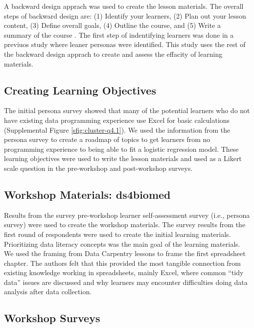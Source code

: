 \documentclass[030-workshop.tex]{subfiles}
\begin{document}
  A backward design apprach was used to create the lesson materials.
  The overall steps of backward design are:
  (1) Identify your learners,
  (2) Plan out your lesson content,
  (3) Define overall goals,
  (4) Outline the course, and
  (5) Write a summary of the course
  \cite{wilson2019teaching}.
  The first step of indentifying learners was done in a previuos study where leaner personas were identified.
  This study uses the rest of the backward design apprach to create and assess the effacity of learning materials.

  \subsection{Creating Learning Objectives}

    The initial persona survey showed that many of the potential learners who do not
    have existing data programming experience use Excel for basic calculations
    (Supplemental Figure \ref{sfig:cluster-q4.1}).
    We used the information from the persona survey to create a roadmap of topics
    to get learners from no programming experience to being able to fit a logistic regression model.
    These learning objectives were used to write the lesson materials
    and used as a Likert scale question in the pre-workshop and post-workshop surveys.

  \subsection{Workshop Materials: ds4biomed}

    Results from the survey pre-workshop learner self-assessment survey (i.e., persona survey)
    were used to create the workshop materials.
    The survey results from the first round of respondents were used to create the initial
    learning materials.
    Prioritizing data literacy concepts was the main goal of the learning materials.
    We used the framing from Data Carpentry lessons to frame the first spreadsheet chapter.
    The authors felt that this provided the most tangible connection from existing knowledge
    working in spreadsheets, mainly Excel,
    where common ``tidy data'' issues are discussed and why learners may encounter difficulties
    doing data analysis after data collection.

  \subsection{Workshop Surveys}
\end{document}
